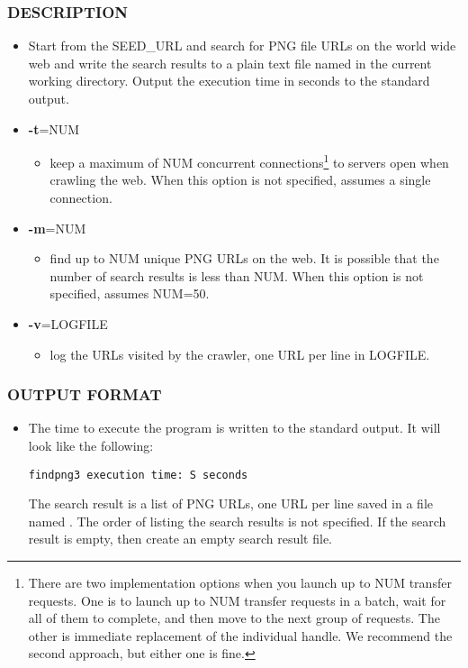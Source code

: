 \subsubsection*{DESCRIPTION}
\begin{itemize}
\item[]Start from the SEED\_URL and search for PNG file URLs on the world wide web and write the search results to a plain text file named  in the current working directory. Output the execution time in seconds to the standard output.
\item[] {\bf -t}=NUM
  \begin{itemize}
  \item[] keep a maximum of NUM concurrent connections\footnote{There are two implementation options when you launch up to NUM transfer requests. One is to launch up to NUM transfer requests in a batch, wait for all of them to complete, and then move to the next group of requests. The other is immediate replacement of the individual handle. We recommend the second approach, but either one is fine.} to servers open when crawling the web. When this option is not specified, assumes a single connection. 
  \end{itemize}
\item[] {\bf -m}=NUM
  \begin{itemize}
  \item[] find up to NUM unique PNG URLs on the web. It is possible that the number of search results is less than NUM. When this option is not specified, assumes NUM=50. 
  \end{itemize}
\item[] {\bf -v}=LOGFILE
  \begin{itemize}
  \item[] log the URLs visited by the crawler, one URL per line in LOGFILE.
  \end{itemize}
\end{itemize}
\subsubsection*{OUTPUT FORMAT}
\begin{itemize}
\item[]The time to execute the program is written to the standard output. It will look like the following:
\begin{verbatim}
findpng3 execution time: S seconds
\end{verbatim}
  The search result is a list of PNG URLs, one URL per line saved in a file named . The order of listing the search results is not specified. If the search result is empty, then create an empty search result file.
\end{itemize}
